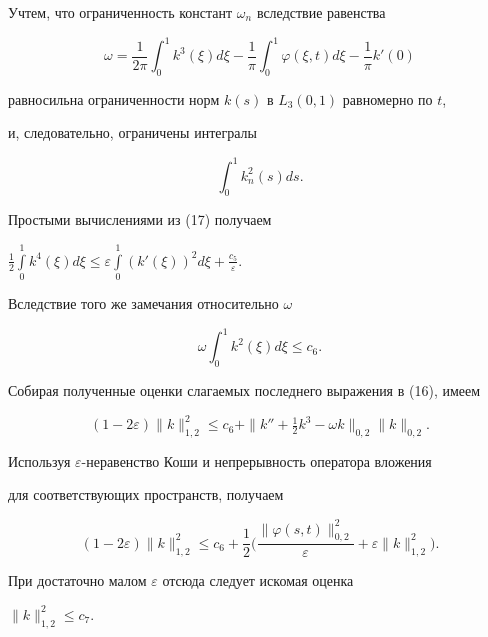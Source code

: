 \begin{pf}
Учтем, что ограниченность констант $\omega_n$ вследствие равенства


$$


\omega=\frac{1}{2\pi}\int_{0}^{1}k^3(\xi) d\xi -


\frac{1}{\pi}\int_{0}^{1}\varphi(\xi, t) d\xi -\frac{1}{\pi}{k}'(0)


$$


равносильна ограниченности норм $k(s)$ в $L_3(0,1)$ равномерно по $t$,


и, следовательно, ограничены интегралы


$$


\int_{0}^{1} {} k_n^2(s) ds.


$$


Простыми вычислениями из (17) получаем 


$\frac{1}{2} \int\limits_{0}^{1}k^4(\xi) d\xi \le


\varepsilon\int\limits_{0}^{1}({k}'(\xi))^2 d\xi +\frac{c_5}{\varepsilon}$.


Вследствие того же замечания относительно $\omega$


$$


\omega \int_{0}^{1}k^2 (\xi) d\xi \le c_6.


$$


Собирая полученные оценки слагаемых последнего выражения в (16), имеем


$$


(1-2 \varepsilon)\| {k}\|_{1,2}^2 \le c_6+\| {k}''+\tfrac{1}{2}k^3


-\omega k\|_{0,2} \| {k} \|_{0,2}.


$$


Используя $\varepsilon$-неравенство Коши и непрерывность оператора вложения


для соответствующих пространств, получаем


$$


(1-2 \varepsilon) \| {k} \|_{1,2}^2 \le c_6+


\frac{1}{2} \bigg(\frac{\| {\varphi (s, t)} \|_{0,2}^2}{\varepsilon} +


\varepsilon \| {k} \|_{1,2}^2 \bigg).


$$


При достаточно малом $\varepsilon$ отсюда следует искомая оценка


$\| {k} \|_{1,2}^2 \le c_7$.


\end{pf}





